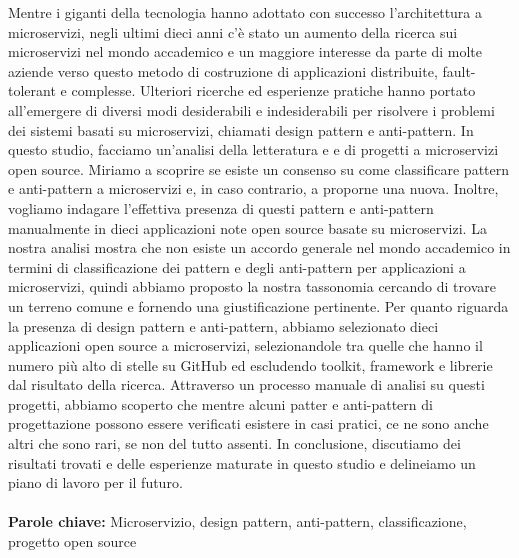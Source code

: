 \documentclass{Configuration_Files/PoliMi3i_thesis}
\begin{document}
Mentre i giganti della tecnologia hanno adottato con successo l’architettura a microservizi, negli ultimi dieci anni c’è stato un aumento della ricerca sui microservizi nel mondo accademico e un maggiore interesse da parte di molte aziende verso questo metodo di costruzione di applicazioni distribuite, fault-tolerant e complesse. Ulteriori ricerche ed esperienze pratiche hanno portato all’emergere di diversi modi desiderabili e indesiderabili per risolvere i problemi dei sistemi basati su microservizi, chiamati design pattern e anti-pattern. In questo studio, facciamo un’analisi della letteratura e e di progetti a microservizi open source. Miriamo a scoprire se esiste un consenso su come classificare pattern e anti-pattern a microservizi e, in caso contrario, a proporne una nuova. Inoltre, vogliamo indagare l’effettiva presenza di questi pattern e anti-pattern manualmente in dieci applicazioni note open source basate su microservizi. La nostra analisi mostra che non esiste un accordo generale nel mondo accademico in termini di classificazione dei pattern e degli anti-pattern per applicazioni a microservizi, quindi abbiamo proposto la nostra tassonomia cercando di trovare un terreno comune e fornendo una giustificazione pertinente. Per quanto riguarda la presenza di design pattern e anti-pattern, abbiamo selezionato dieci applicazioni open source a microservizi, selezionandole tra quelle che hanno il numero più alto di stelle su GitHub ed escludendo toolkit, framework e librerie dal risultato della ricerca. Attraverso un processo manuale di analisi su questi progetti, abbiamo scoperto che mentre alcuni patter e anti-pattern di progettazione possono essere verificati esistere in casi pratici, ce ne sono anche altri che sono rari, se non del tutto assenti. In conclusione, discutiamo dei risultati trovati e delle esperienze maturate in questo studio e delineiamo un piano di lavoro per il futuro. 
\\
\\
\textbf{Parole chiave:} Microservizio, design pattern, anti-pattern, classificazione, progetto open source %


\thispagestyle{empty}
\tableofcontents %
\thispagestyle{empty}
\cleardoublepage
\end{document}

